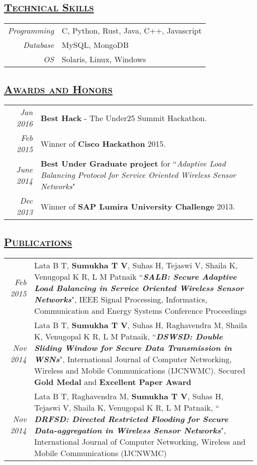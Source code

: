 \documentclass[14pt]{article}
\begin{document}
\subsection* {\scshape\large\uline {Technical Skills}}
\begin{tabular}{r l}
\emph{Programming} & C, Python, Rust, Java, C++, Javascript \\
\emph{Database}	  & MySQL, MongoDB \\
\emph{OS} & Solaris, Linux, Windows
\end{tabular}

\subsection* {\scshape\large\uline {Awards and Honors}}
\begin{tabularx}{\textwidth}{r X}
\emph{Jan 2016} &  \textbf{Best Hack} - The Under25 Summit Hackathon.\\ 
\emph{Feb 2015} & Winner of \textbf{Cisco Hackathon} 2015.\\ 
\emph{June 2014} & \textbf{Best Under Graduate project} for ``\emph{Adaptive Load Balancing Protocol for Service Oriented Wireless Sensor Networks}" \\ 
\emph{Dec 2013} & Winner of \textbf{SAP Lumira University Challenge} 2013. \\ 
\end{tabularx}

\subsection* {\scshape\large\uline {Publications}}
\begin{tabularx}{\textwidth}{r X}
\emph{Feb 2015} & Lata B T, \textbf{Sumukha T V}, Suhas H, Tejaswi V, Shaila K, Venugopal K R, L M Patnaik ``\textbf{\textit{SALB: Secure Adaptive Load 		         Balancing in Service Oriented Wireless Sensor Networks}}",  IEEE Signal Processing, Informatics, Communication and Energy Systems Conference Proceedings \\ 
\emph{Nov 2014} & Lata B T, \textbf{Sumukha T V}, Suhas H, Raghavendra M, Shaila K, Venugopal K R, L M Patnaik, ``\textbf{\textit{DSWSD: Double Sliding Window for Secure Data Transmission in WSNs}}", International Journal of Computer Networking, Wireless and Mobile Communications (IJCNWMC). Secured \textbf{Gold Medal} and \textbf{Excellent Paper Award} \\ 
\emph{Nov 2014} & Lata B T, Raghavendra M,  \textbf{Sumukha T V}, Suhas H, Tejaswi V, Shaila K, Venugopal K R, L M Patnaik, `` \textbf{\textit{DRFSD: Directed Restricted Flooding for Secure Data-aggregation in Wireless Sensor Networks}}", International Journal of Computer Networking, Wireless and Mobile Communications (IJCNWMC)
\end{tabularx}
\end{document}
